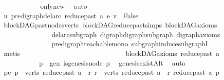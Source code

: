 \begin{isabellebody}
\ \ \ \ \ \ \ \ \ \ \isamarkupfalse%
\ only{\isacharunderscore}{\kern0pt}new\ \isamarkupfalse%
\ auto\ \ \ \ \ \ \ \ \isanewline
\ \ \ \ \ \ \ \ \isamarkupfalse%
\ \isamarkupfalse%
\ {\isachardoublequoteopen}u\ {\isasymrightarrow}\isactrlsup {\isacharasterisk}{\kern0pt}\isactrlbsub pre{\isacharunderscore}{\kern0pt}digraph{\isachardot}{\kern0pt}del{\isacharunderscore}{\kern0pt}arc\ {\isacharparenleft}{\kern0pt}reduce{\isacharunderscore}{\kern0pt}past\ a{\isacharparenright}{\kern0pt}\ e\isactrlesub \ v\ {\isasymLongrightarrow}\ False{\isachardoublequoteclose}\isanewline
\ \ \ \ \ \ \ \ \ \ \isamarkupfalse%
\ blockDAG{\isachardot}{\kern0pt}past{\isacharunderscore}{\kern0pt}nodes{\isacharunderscore}{\kern0pt}verts\ blockDAG{\isachardot}{\kern0pt}reduce{\isacharunderscore}{\kern0pt}past{\isachardot}{\kern0pt}simps\ blockDAG{\isacharunderscore}{\kern0pt}axioms\isanewline
\ \ \ \ \ \ \ \ \ \ \ \ \ \ \ del{\isacharunderscore}{\kern0pt}arc{\isacharunderscore}{\kern0pt}subgraph\ digraph{\isachardot}{\kern0pt}digraph{\isacharunderscore}{\kern0pt}subgraph\ digraph{\isacharunderscore}{\kern0pt}axioms\ \isanewline
\ \ \ \ \ \ \ \ \ \ \ \ \ \ \ pre{\isacharunderscore}{\kern0pt}digraph{\isachardot}{\kern0pt}reachable{\isacharunderscore}{\kern0pt}mono\ subgraph{\isacharunderscore}{\kern0pt}induce{\isacharunderscore}{\kern0pt}subgraphI\isanewline
\ \ \ \ \ \ \ \ \ \ \isamarkupfalse%
\ metis\isanewline
\ \ \ \ \ \ \isamarkupfalse%
\isanewline
\ \ \ \ \isamarkupfalse%
\isanewline
\ \ \ \ \isamarkupfalse%
\ \isanewline
\ \ \ \ \ \ \isamarkupfalse%
\isanewline
\ \ \ \ \ \ {\isachardoublequoteopen}blockDAG{\isacharunderscore}{\kern0pt}axioms\ {\isacharparenleft}{\kern0pt}reduce{\isacharunderscore}{\kern0pt}past\ a{\isacharparenright}{\kern0pt}{\isachardoublequoteclose}\isanewline
\ \ \ \ \ \ \isamarkupfalse%
\ \isanewline
\ \ \ \ \ \ \ \ \isamarkupfalse%
\ p\ \ gen{\isacharcolon}{\kern0pt}\ {\isachardoublequoteopen}is{\isacharunderscore}{\kern0pt}genesis{\isacharunderscore}{\kern0pt}node\ p{\isachardoublequoteclose}\ \isamarkupfalse%
\ genesis{\isacharunderscore}{\kern0pt}existAlt\ \isamarkupfalse%
\ auto\isanewline
\ \ \ \ \ \ \ \ \isamarkupfalse%
\ pe{\isacharcolon}{\kern0pt}\ {\isachardoublequoteopen}p\ {\isasymin}\ verts\ {\isacharparenleft}{\kern0pt}reduce{\isacharunderscore}{\kern0pt}past\ a{\isacharparenright}{\kern0pt}\ {\isasymand}\ {\isacharparenleft}{\kern0pt}{\isasymforall}r{\isachardot}{\kern0pt}\ r\ {\isasymin}\ verts\ {\isacharparenleft}{\kern0pt}reduce{\isacharunderscore}{\kern0pt}past\ a{\isacharparenright}{\kern0pt}\ {\isasymlongrightarrow}\ r\ {\isasymrightarrow}\isactrlsup {\isacharasterisk}{\kern0pt}\isactrlbsub reduce{\isacharunderscore}{\kern0pt}past\ a\isactrlesub \ p{\isacharparenright}{\kern0pt}{\isachardoublequoteclose}\isanewline

\end{isabellebody}
